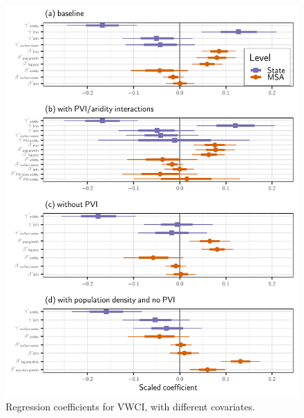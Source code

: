 \documentclass[draft]{agujournal}\usepackage{knitr}
\begin{document}
\begin{figure}
\includegraphics[width=6.25in]{figures_si/vwci_pvi_cat_plots-1} \caption[Regression coefficients for VWCI, with different covariates]{Regression coefficients for VWCI, with different covariates.}\label{fig:vwci_pvi_cat_plots}
\end{figure}




\end{document}
